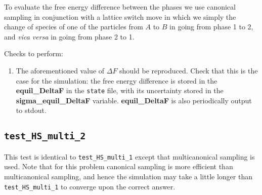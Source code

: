 \documentclass{report}
\begin{document}
To evaluate the free energy difference between the phases we use canonical sampling in conjunction with a lattice switch move in which we simply the 
change of species of one of the particles from $A$ to $B$ in going from phase 1 to 2, and \emph{vica versa} in going from phase 2 to 1.

Checks to perform:
\begin{enumerate}
\item The aforementioned value of $\Delta F$ should be reproduced. Check that this is the case for the
simulation: the free energy difference is stored in the \textbf{equil\_DeltaF} in the \texttt{state} file, with its uncertainty
stored in the \textbf{sigma\_equil\_DeltaF} variable. \textbf{equil\_DeltaF} is also periodically output to stdout.
\end{enumerate}


\subsection{\texttt{test\_HS\_multi\_2}}
This test is identical to \texttt{test\_HS\_multi\_1} except that multicanonical sampling is used. Note that for this problem canonical sampling
is more efficient than multicanonical sampling, and hence the simulation may take a little longer than \texttt{test\_HS\_multi\_1} to converge
upon the correct answer.




\end{document}
